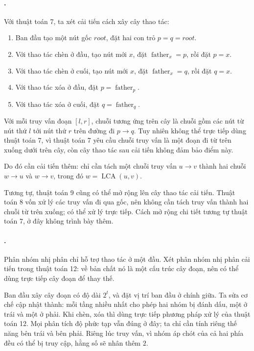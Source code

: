 \documentclass[11pt]{article}
\begin{document}
\paragraph{.}
Với thuật toán 7, ta xét cải tiến cách xây cây thao tác:
\begin{enumerate}
  \item Ban đầu tạo một nút gốc \(\mathit{root}\), đặt hai con trỏ
  \(p=q=\mathit{root}\).
  \item Với thao tác chèn ở đầu, tạo nút mới \(x\), đặt
  \(\operatorname{father}_x=p\), rồi đặt \(p=x\).
  \item Với thao tác chèn ở cuối, tạo nút mới \(x\), đặt
  \(\operatorname{father}_x=q\), rồi đặt \(q=x\).
  \item Với thao tác xóa ở đầu, đặt \(p=\operatorname{father}_p\).
  \item Với thao tác xóa ở cuối, đặt \(q=\operatorname{father}_q\).
\end{enumerate}

Với mỗi truy vấn đoạn \([l,r]\), chuỗi tương ứng trên cây là chuỗi gồm các nút
từ nút thứ \(l\) tới nút thứ \(r\) trên đường đi \(p\to q\). Tuy nhiên không
thể trực tiếp dùng thuật toán 7, vì thuật toán 7 yêu cầu chuỗi truy vấn là một
đoạn đi từ trên xuống dưới trên cây, còn cây thao tác sau cải tiến không đảm
bảo điểm này.

Do đó cần cải tiến thêm: chỉ cần tách một chuỗi truy vấn \(u\to v\) thành hai
chuỗi \(w\to u\) và \(w\to v\), trong đó \(w=\operatorname{LCA}(u,v)\).

Tương tự, thuật toán 9 cũng có thể mở rộng lên cây thao tác cải tiến. Thuật
toán 8 vốn xử lý các truy vấn đi qua gốc, nên không cần tách truy vấn thành
hai chuỗi từ trên xuống; có thể xử lý trực tiếp. Cách mở rộng chi tiết tương
tự thuật toán 7, ở đây không trình bày thêm.

\paragraph{.}
Phân nhóm nhị phân chỉ hỗ trợ thao tác ở một đầu. Xét phân nhóm nhị phân cải
tiến trong thuật toán 12: về bản chất nó là một cấu trúc cây đoạn, nên có thể
dùng trực tiếp cây đoạn để thay thế.

Ban đầu xây cây đoạn có độ dài \(2^t\), và đặt vị trí ban đầu ở chính giữa.
Ta sửa cơ chế cập nhật thành: mỗi tầng nhiều nhất cho phép hai nhóm bị đánh
dấu, một ở trái và một ở phải. Khi chèn, xóa thì dùng trực tiếp phương pháp xử
lý của thuật toán 12. Mọi phân tích độ phức tạp vẫn đúng ở đây; ta chỉ cần
tính riêng thế năng bên trái và bên phải. Riêng lúc truy vấn, vì nhóm áp chót
của cả hai phía đều có thể bị truy cập, hằng số sẽ nhân thêm \(2\).
\end{document}
